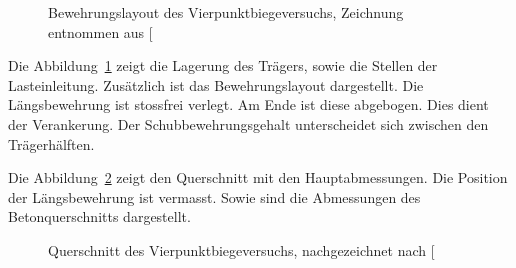 \documentclass[
  11pt,
  letterpaper,
]{scrreprt}
\begin{document}
\begin{figure}[H]


\caption{\label{fig-versuchsskizze-SV14}Bewehrungslayout des
Vierpunktbiegeversuchs, Zeichnung entnommen aus
{[}\citeproc{ref-gitz_ansatze_2024}{1}{]}}

\end{figure}%

Die Abbildung~\ref{fig-versuchsskizze-SV14} zeigt die Lagerung des
Trägers, sowie die Stellen der Lasteinleitung. Zusätzlich ist das
Bewehrungslayout dargestellt. Die Längsbewehrung ist stossfrei verlegt.
Am Ende ist diese abgebogen. Dies dient der Verankerung. Der
Schubbewehrungsgehalt unterscheidet sich zwischen den Trägerhälften.

Die Abbildung~\ref{fig-QS-SV14} zeigt den Querschnitt mit den
Hauptabmessungen. Die Position der Längsbewehrung ist vermasst. Sowie
sind die Abmessungen des Betonquerschnitts dargestellt.

\begin{figure}[H]


\caption{\label{fig-QS-SV14}Querschnitt des Vierpunktbiegeversuchs,
nachgezeichnet nach {[}\citeproc{ref-gitz_ansatze_2024}{1}{]}}

\end{figure}%
\end{document}
